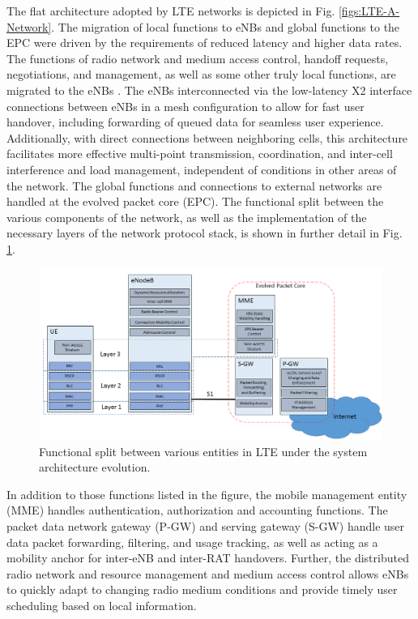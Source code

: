The flat architecture adopted by LTE networks is depicted in Fig. \ref{figs:LTE-A-Network}.  The migration of local functions to eNBs and global functions to the EPC were driven by the requirements of reduced latency and higher data rates. The functions of radio network and medium access control, handoff requests, negotiations, and management, as well as some other truly local functions, are migrated to the eNBs \cite{tr36300}. The eNBs interconnected via the low-latency X2 interface connections between eNBs in a mesh configuration to allow for fast user handover, including forwarding of queued data for seamless user experience.  Additionally, with direct connections between neighboring cells, this architecture facilitates more effective multi-point transmission, coordination, and inter-cell interference and load management, independent of conditions in other areas of the network. The global functions and connections to external networks are handled at the evolved packet core (EPC). The functional split between the various components of the network, as well as the implementation of the necessary layers of the network protocol stack, is shown in further detail in Fig. \ref{figs:funcSplit}.
\begin{figure}[!ht]
	\centering
	\includegraphics[width=\textwidth]{figs/LTE-decomp}
	\caption{Functional split between various entities in LTE under the system architecture evolution.}
	\label{figs:funcSplit}
\end{figure}
In addition to those functions listed in the figure, the mobile management entity (MME) handles authentication, authorization and accounting functions.  The packet data network gateway (P-GW) and serving gateway (S-GW) handle user data packet forwarding, filtering, and usage tracking, as well as acting as a mobility anchor for inter-eNB and inter-RAT handovers.  Further, the distributed radio network and resource management and medium access control allows eNBs to quickly adapt to changing radio medium conditions and provide timely user scheduling based on local information.

